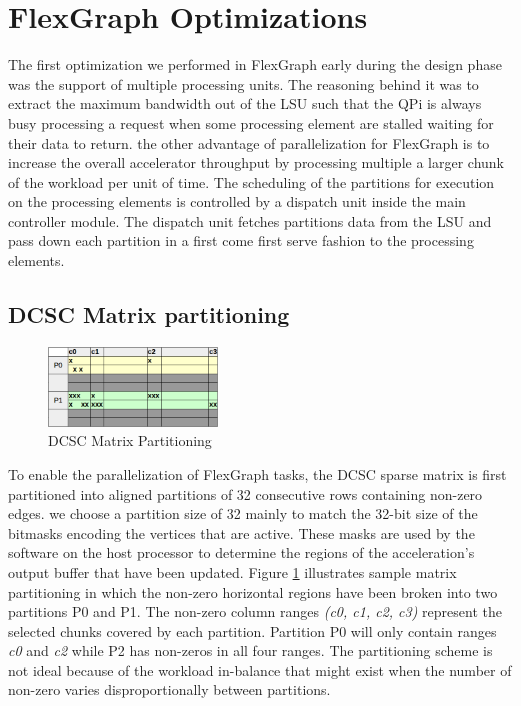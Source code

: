 \section{FlexGraph Optimizations}

The first optimization we performed in FlexGraph early during the design phase was the support of multiple processing units. The reasoning behind it was to extract the maximum bandwidth out of the LSU such that the QPi is always busy processing a request when some processing element are stalled waiting for their data to return. the other advantage of parallelization for FlexGraph is to increase the overall accelerator throughput by processing multiple a larger chunk of the workload per unit of time. The scheduling of the partitions for execution on the processing elements is controlled by a dispatch unit inside the main controller module. The dispatch unit fetches partitions data from the LSU and pass down each partition in a first come first serve fashion to the processing elements.

\subsection{DCSC Matrix partitioning}

\begin{figure}[htbp]
\centering
\includegraphics[width=0.4\textwidth]{figures/matrix_partitioning}
\caption{DCSC Matrix Partitioning}
\label{fig:matrix_partitioning}
\end{figure}

To enable the parallelization of FlexGraph tasks, the DCSC sparse matrix is first partitioned into aligned partitions of 32 consecutive rows containing non-zero edges. we choose a partition size of 32 mainly to match the 32-bit size of the bitmasks encoding the vertices that are active. These masks are used by the software on the host processor to determine the regions of the acceleration's output buffer that have been updated. Figure \ref{fig:matrix_partitioning} illustrates sample matrix partitioning in which the non-zero horizontal regions have been broken into two partitions P0 and P1. The non-zero column ranges \textit{(c0, c1, c2, c3)} represent the selected chunks covered by each partition. Partition P0 will only contain ranges \textit{c0} and \textit{c2} while P2 has non-zeros in all four ranges. The partitioning scheme is not ideal because of the workload in-balance that might exist when the number of non-zero varies disproportionally between partitions.  

